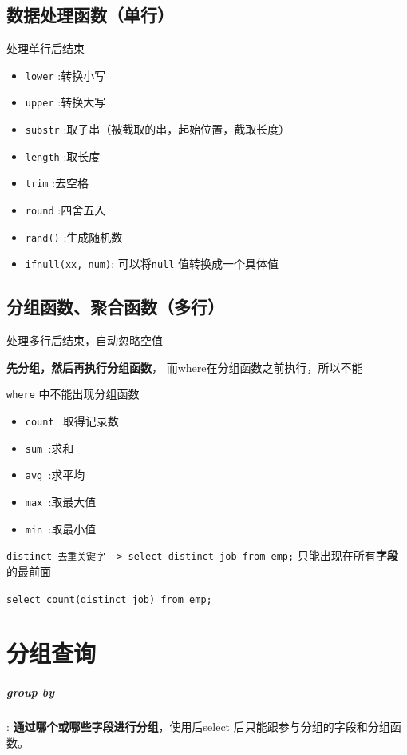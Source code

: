 \documentclass[UTF8,a4paper,12pt]{ctexbook}
\begin{document}
		
		\subsection{数据处理函数（单行）}处理单行后结束
			\begin{itemize}[itemindent = 2em]
				\item \verb|lower| :转换小写
				\item \verb|upper| :转换大写
				\item \verb|substr| :取子串（被截取的串，起始位置，截取长度）
				\item \verb|length| :取长度
				\item \verb|trim| :去空格
				\item \verb|round| :四舍五入
				\item \verb|rand()| :生成随机数
				\item \verb|ifnull(xx, num)|: 可以将\verb|null| 值转换成一个具体值
			\end{itemize}
		
		
		\subsection{分组函数、聚合函数（多行）}
		
			处理多行后结束，自动忽略空值
			
			\textbf{先分组，然后再执行分组函数}， 而where在分组函数之前执行，所以不能
			
			\verb|where| 中不能出现分组函数
			
			\begin{itemize}[itemindent = 2em]
				\item \verb|count |:取得记录数
				\item \verb|sum |:求和
				\item \verb|avg |:求平均
				\item \verb|max |:取最大值
				\item \verb|min |:取最小值
			\end{itemize}
			
			\verb|distinct 去重关键字 -> select distinct job from emp;|  只能出现在所有\textbf{字段}的最前面
			
			\verb|select count(distinct job) from emp;|
			
	\section{分组查询}
			\subparagraph{group by}: \textbf{通过哪个或哪些字段进行分组}，使用后select 后只能跟参与分组的字段和分组函数。
			
\end{document}
